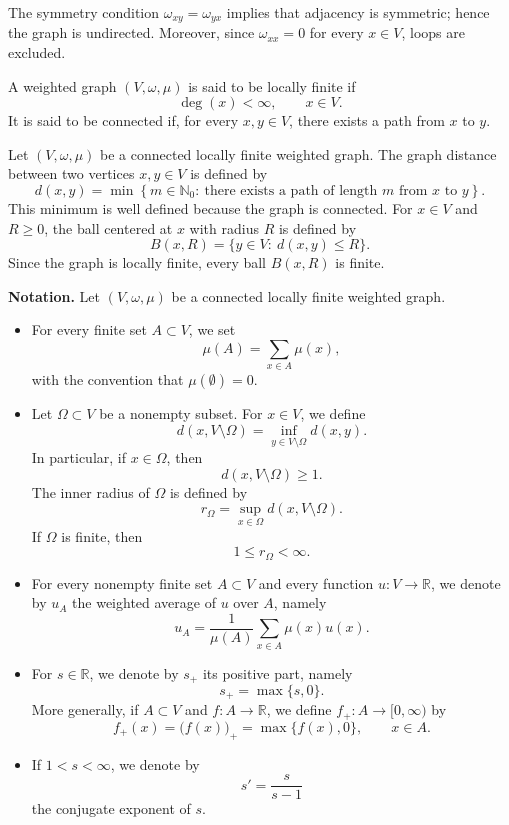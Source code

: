 \documentclass[twoside,12pt,letter]{article}
\theoremstyle{plain}
\theoremstyle{definition}
\theoremstyle{remark}
\numberwithin{equation}{section}
\begin{document}
The symmetry condition \(\omega_{xy}=\omega_{yx}\) implies that adjacency is
symmetric; hence the graph is undirected. Moreover, since \(\omega_{xx}=0\) for
every \(x\in V\), loops are excluded.

A weighted graph \((V,\omega,\mu)\) is said to be locally finite if
\[
\deg(x)<\infty,\qquad x\in V.
\]
It is said to be connected if, for every \(x,y\in V\), there exists a path from
\(x\) to \(y\).

Let \((V,\omega,\mu)\) be a connected locally finite weighted graph. The graph
distance between two vertices \(x,y\in V\) is defined by
\[
d(x,y)=\min\left\{m\in\mathbb{N}_0:\ \text{there exists a path of length }m
\text{ from }x\text{ to }y\right\}.
\]
This minimum is well defined because the graph is connected. For \(x\in V\)
and \(R\ge 0\), the ball centered at \(x\) with radius \(R\) is defined by
\[
B(x,R)=\{y\in V:\ d(x,y)\le R\}.
\]
Since the graph is locally finite, every ball \(B(x,R)\)  is finite.

\medskip 



\noindent\textbf{Notation.}
Let \((V,\omega,\mu)\) be a connected locally finite weighted graph.
\begin{itemize}
\item For every finite set \(A\subset V\), we set
\[
\mu(A)=\sum_{x\in A}\mu(x),
\]
with the convention that \(\mu(\emptyset)=0\).

\item Let \(\Omega\subset V\) be a nonempty subset. For \(x\in V\), we define
\[
d(x,V\setminus\Omega)=\inf_{y\in V\setminus\Omega}d(x,y).
\]
In particular, if \(x\in\Omega\), then
\[
d(x,V\setminus\Omega)\ge1.
\]
The inner radius of \(\Omega\) is defined by
\begin{equation}\label{r-Omega}
r_\Omega=\sup_{x\in\Omega}d(x,V\setminus\Omega).
\end{equation}
If \(\Omega\) is finite, then
\[
1\le r_\Omega<\infty.
\]

\item For every nonempty finite set \(A\subset V\) and every function
\(u:V\to\mathbb R\), we denote by \(u_A\) the weighted average of \(u\) over
\(A\), namely
\[
u_A
=
\frac{1}{\mu(A)}
\sum_{x\in A}\mu(x)u(x).
\]

\item For \(s\in\mathbb R\), we denote by \(s_+\) its positive part, namely
\[
s_+=\max\{s,0\}.
\]
More generally, if \(A\subset V\) and \(f:A\to\mathbb R\), we define
\(f_+:A\to[0,\infty)\) by
\[
f_+(x)=\bigl(f(x)\bigr)_+=\max\{f(x),0\},
\qquad x\in A.
\]

\item If \(1<s<\infty\), we denote by
\[
s'=\frac{s}{s-1}
\]
the conjugate exponent of \(s\).
\end{itemize}
\end{document}
